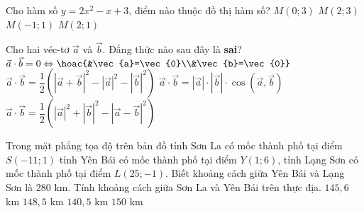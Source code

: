 \begin{ex}%
Cho hàm số $y=2x^2-x+3$, điểm nào thuộc đồ thị hàm số?	
	\choice
	{\True $M(0;3)$}
	{$M(2;3)$}
	{$M(-1;1)$}
	{$M(2;1)$}
\end{ex}

\begin{ex}%
	Cho hai véc-tơ $\vec{a}$ và $\vec{b}$. Đẳng thức nào sau đây là \textbf{sai}?
	\choice
	{$\vec{a} \cdot \vec{b}=0 \Leftrightarrow \hoac{&\vec{a}=\vec{0}\\&\vec{b}=\vec{0}}$}
	{$\vec{a} \cdot \vec{b}=\dfrac{1}{2}\left(\left|\vec{a}+\vec{b} \right|^2-\left|\vec{a} \right|^2-\left|\vec{b} \right|^2\right)$}
	{\True $\vec{a} \cdot \vec{b}=\left|\vec{a} \right|\cdot \left|\vec{b} \right|\cdot \cos \left(\vec{a} , \vec{b} \right)$}
	{$\vec{a} \cdot \vec{b}=\dfrac{1}{2}\left(\left|\vec{a} \right|^2+ \left|\vec{b} \right|^2-\left|\vec{a} -\vec{b} \right|^2\right)$}
\end{ex}
\begin{ex}%
	Trong mặt phẳng tọa độ trên bản đồ tỉnh Sơn La có mốc thành phố tại điểm $S(-11;1)$ tỉnh Yên Bái có mốc thành phố tại điểm $Y(1;6)$, tỉnh Lạng Sơn có mốc thành phố tại điểm $L(25;-1)$. Biết khoảng cách giữa Yên Bái và Lạng Sơn là $280$ km. Tính khoảng cách giữa Sơn La và Yên Bái trên thực địa.
	\choice
	{\True $145{,}6$ km}
	{$148{,}5$ km}
	{$140{,}5$ km}
	{$150$ km}
\end{ex}
